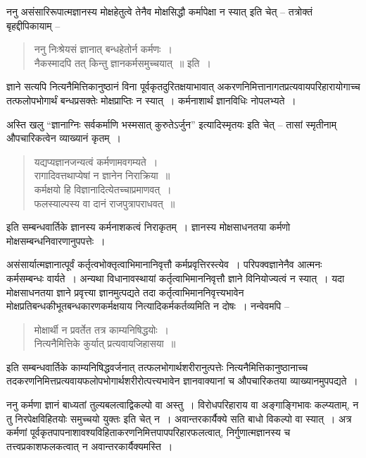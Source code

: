 {ननु असंसारिरूपात्मज्ञानस्य मोक्षहेतुत्वे तेनैव मोक्षसिद्धौ कर्मापेक्षा न स्यात् इति चेत् – तत्रोक्तं बृहद्दीपिकायाम् –
\begin{verse}
ननु निःश्रेयसं ज्ञानात् बन्धहेतोर्न कर्मणः~। \\
नैकस्मादपि तत् किन्तु ज्ञानकर्मसमुच्चयात्~॥ इति~। 
\end{verse}
ज्ञाने सत्यपि नित्यनैमित्तिकानुष्ठानं विना पूर्वकृतदुरितक्षयाभावात् अकरणनिमित्तानागत\-प्रत्यवायपरिहारायोगाच्च तत्फलोपभोगार्थं बन्धप्रसक्तेः मोक्षप्राप्तिः न स्यात्~। कर्मनाशार्थं ज्ञानविधिः नोपलभ्यते~। 

अस्ति खलु “ज्ञानाग्निः सर्वकर्माणि भस्मसात् कुरुतेऽर्जुन” इत्यादिस्मृतयः इति चेत् – तासां स्मृतीनाम् औपचारिकत्वेन व्याख्यानं कृतम्~। 
\begin{verse}
यद्यप्यज्ञानजन्यत्वं कर्मणामवगम्यते~। \\
रागादिवत्तथाप्येषां न ज्ञानेन निराक्रिया~॥\\
कर्मक्षयो हि विज्ञानादित्येतच्चाप्रमाणवत्~। \\
फलस्याल्पस्य वा दानं राजपुत्रापराधवत्~॥
\end{verse}
इति सम्बन्धवार्तिके ज्ञानस्य कर्मनाशकत्वं निराकृतम्~। ज्ञानस्य मोक्षसाधनतया कर्मणो मोक्षसम्बन्धनिवारणानुपपत्तेः~। 

असंसार्यात्मज्ञानात्पूर्वं कर्तृत्वभोक्तृत्वाभिमानानिवृत्तौ कर्मप्रवृत्तिरस्त्येव~। परिपक्वज्ञानेनैव आत्मनः कर्मसम्बन्धः वार्यते~। अन्यथा विधानावस्थायां कर्तृत्वाभिमाननिवृत्तौ ज्ञाने विनियोज्यत्वं न स्यात्~। यदा मोक्षसाधनतया ज्ञाने प्रवृत्त्या ज्ञानमुत्पद्यते तदा कर्तृत्वाभिमाननिवृत्त्यभावेन मोक्षप्रतिबन्धकीभूतबन्धकारणकर्मक्षयाय नित्यादिकर्मकर्तव्यमिति न दोषः~। नन्वेवमपि –
\begin{verse}
मोक्षार्थी न प्रवर्तेत तत्र काम्यनिषिद्धयोः~। \\
नित्यनैमित्तिके कुर्यात् प्रत्यवायजिहासया~॥
\end{verse}
इति सम्बन्धवार्तिके काम्यनिषिद्धवर्जनात् तत्फलभोगार्थशरीरानुत्पत्तेः नित्यनैमित्तिकानुष्ठानाच्च तदकरणनिमित्तप्रत्यवायफलोपभोगार्थशरीरोत्पत्त्यभावेन ज्ञानवाक्यानां च औपचारिकतया व्याख्यानमुपपद्यते~। 

ननु कर्मणा ज्ञानं बाध्यतां तुल्यबलत्वाद्विकल्पो वा अस्तु~। विरोधपरिहाराय वा अङ्गाङ्गिभावः कल्प्यताम्, न तु निरपेक्षविहितयोः समुच्चयो युक्तः इति चेत् न~। अवान्तरकार्यैक्ये सति बाधो विकल्पो वा स्यात्~। अत्र कर्मणां पूर्वकृतपापनाशावश्यविहिताकरणनिमित्तपापपरिहार\-फलत्वात्, निर्गुणात्मज्ञानस्य च तत्त्वप्रकाशफलकत्वात् न अवान्तरकार्यैक्यमस्ति~। 

}
